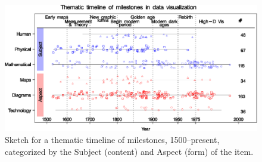 \begin{figure}[!htb]
  \centering
  \includegraphics[width=\textwidth,clip]{fig/milecatline}
  \caption{Sketch for a thematic timeline of milestones, 1500--present, categorized by the Subject (content) and Aspect (form) of the item.}
  \label{fig:milecatline}
\end{figure}